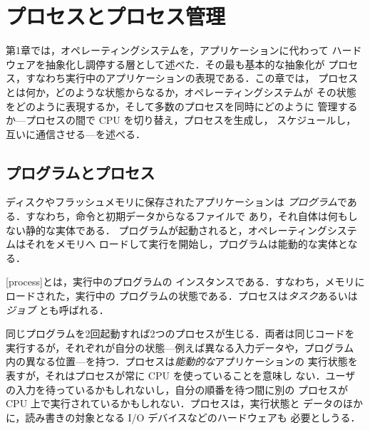 \documentclass[../main.tex]{subfiles}
\begin{document}
\chapter{プロセスとプロセス管理}

第1章では，オペレーティングシステムを，アプリケーションに代わって
ハードウェアを抽象化し調停する層として述べた．その最も基本的な抽象化が
プロセス，すなわち実行中のアプリケーションの表現である．この章では，
プロセスとは何か，どのような状態からなるか，オペレーティングシステムが
その状態をどのように表現するか，そして多数のプロセスを同時にどのように
管理するか---プロセスの間で CPU を切り替え，プロセスを生成し，
スケジュールし，互いに通信させる---を述べる．

\section{プログラムとプロセス}
\label{sec:l02-process}

ディスクやフラッシュメモリに保存されたアプリケーションは
\emph{プログラム}である．すなわち，命令と初期データからなるファイルで
あり，それ自体は何もしない静的な実体である．%
プログラムが起動されると，オペレーティングシステムはそれをメモリへ
ロードして実行を開始し，プログラムは能動的な実体となる．

\begin{definition}[プロセス]
  \label{def:l02-process}
  [process]とは，実行中のプログラムの
  インスタンスである．すなわち，メモリにロードされた，実行中の
  プログラムの状態である．プロセスは\emph{タスク}あるいは\emph{ジョブ}%
  とも呼ばれる．
\end{definition}

同じプログラムを2回起動すれば2つのプロセスが生じる．両者は同じコードを
実行するが，それぞれが自分の状態---例えば異なる入力データや，プログラム
内の異なる位置---を持つ．プロセスは\emph{能動的な}アプリケーションの
実行状態を表すが，それはプロセスが常に CPU を使っていることを意味し
ない．ユーザの入力を待っているかもしれないし，自分の順番を待つ間に別の
プロセスが CPU 上で実行されているかもしれない．プロセスは，実行状態と
データのほかに，読み書きの対象となる I/O デバイスなどのハードウェアも
必要としうる．
\end{document}
